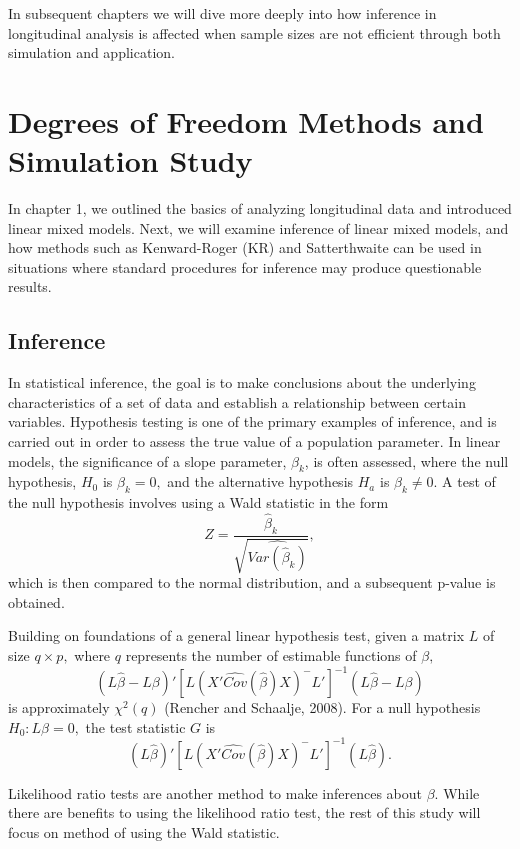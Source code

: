 \documentclass[12pt, twoside]{amherstthesis}
\begin{document}
In subsequent chapters we will dive more deeply into how inference in longitudinal analysis is affected when sample sizes are not efficient through both simulation and application.

\hypertarget{rmd-basics}{%
\chapter{Degrees of Freedom Methods and Simulation Study}\label{rmd-basics}}

In chapter 1, we outlined the basics of analyzing longitudinal data and introduced linear mixed models. Next, we will examine inference of linear mixed models, and how methods such as Kenward-Roger (KR) and Satterthwaite can be used in situations where standard procedures for inference may produce questionable results.

\hypertarget{inference}{%
\section{Inference}\label{inference}}

In statistical inference, the goal is to make conclusions about the underlying characteristics of a set of data and establish a relationship between certain variables. Hypothesis testing is one of the primary examples of inference, and is carried out in order to assess the true value of a population parameter. In linear models, the significance of a slope parameter, \(\beta_k\), is often assessed, where the null hypothesis, \(H_0\) is \(\beta_k = 0,\) and the alternative hypothesis \(H_a\) is \(\beta_k \neq 0.\) A test of the null hypothesis involves using a Wald statistic in the form \[ Z = \frac{\hat\beta_k}{\sqrt{\widehat{Var(\hat\beta_k)}}},\] which is then compared to the normal distribution, and a subsequent p-value is obtained.

Building on foundations of a general linear hypothesis test, given a matrix \(L\) of size \(q \times p,\) where \(q\) represents the number of estimable functions of \(\beta,\) \[(L\hat\beta-L\beta)'[L(X'\widehat {Cov}(\hat\beta)X)^-L']^{-1}(L\hat\beta-L\beta)
\] is approximately \(\chi^2(q)\) (Rencher and Schaalje, 2008). For a null hypothesis \(H_0: L\beta = 0,\) the test statistic \(G\) is \[(L\hat\beta)'[L(X'\widehat {Cov}(\hat\beta)X)^-L']^{-1}(L\hat\beta).\]

Likelihood ratio tests are another method to make inferences about \(\beta\). While there are benefits to using the likelihood ratio test, the rest of this study will focus on method of using the Wald statistic.
\end{document}
